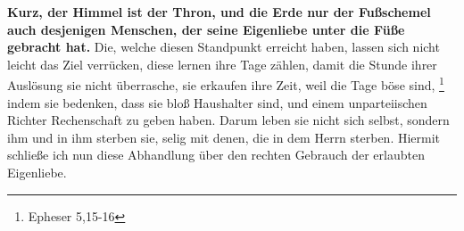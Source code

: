 \medskip

\textbf{Kurz, der Himmel ist der Thron, und die Erde nur der Fußschemel auch desjenigen
Menschen, der seine Eigenliebe unter die Füße gebracht hat.} Die, welche diesen
Standpunkt erreicht haben, lassen sich nicht leicht das Ziel verrücken, diese
lernen ihre Tage zählen, damit die Stunde ihrer Auslösung sie nicht überrasche,
sie erkaufen ihre Zeit, weil die Tage böse sind,
\footnote{Epheser 5,15-16}
indem
sie bedenken, dass sie bloß Haushalter sind, und einem unparteiischen Richter
Rechenschaft zu geben haben. Darum leben sie nicht sich selbst, sondern ihm und
in ihm sterben sie, selig mit denen, die in dem Herrn sterben. Hiermit schließe
ich nun diese Abhandlung über den rechten Gebrauch der erlaubten Eigenliebe.







